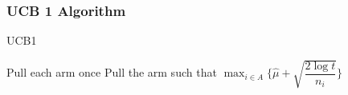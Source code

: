 \documentclass{beamer}
\begin{document}

\frametitle{UCB 1 Algorithm}
\begin{algorithm}[!h]
\caption{UCB1}
\begin{algorithmic}[1]
\State Pull each arm once
\State Pull the arm such that $\max_{i\in A}\bigg\lbrace\hat{\mu} + \sqrt{\dfrac{2\log t}{n_i}}\bigg\rbrace$
 \EndFor
\end{algorithmic}
\end{algorithm}

\cite{auer2002finite}


%
\end{document}
